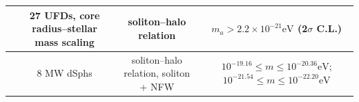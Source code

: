 \begin{table}[!htbp]
{\begin{tabular}{|c|c|c|c|}
            \hline \cite{benito2025fuzzy}                & 27 UFDs, core radius--stellar mass scaling            & soliton--halo relation                        & $m_a > 2.2\times10^{-21}\mathrm{eV}$ (2$\sigma$ C.L.) \\
            \hline \cite{wardana2026fuzzydark}           & 8 MW dSphs                                            & soliton--halo relation, soliton + NFW         & $10^{-19.16} \le m \le 10^{-20.36}\mathrm{eV}$; $10^{-21.54} \le m \le 10^{-22.20}\mathrm{eV}$ \\
            \hline
        \end{tabular}
    }
\end{table}